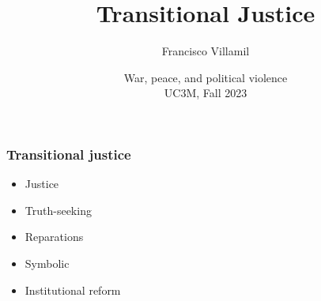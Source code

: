 \documentclass[aspectratio=43]{beamer}
\title{\huge Transitional Justice}
\author{Francisco Villamil}
\date{War, peace, and political violence\\UC3M, Fall 2023}
\begin{document}
\begin{frame}
  \titlepage
\end{frame}



\begin{frame}
\frametitle{Transitional justice}
\centering

\begin{itemize}[<+->]
  \item Justice
  \item Truth-seeking
  \item Reparations
  \item Symbolic
  \item Institutional reform
\end{itemize}


\end{frame}
\end{document}
